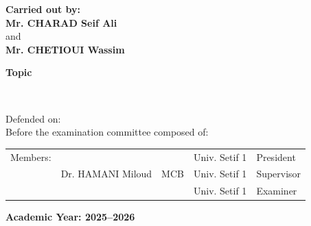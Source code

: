 \documentclass[11pt,a4paper]{report}
\newcommand{\dotline}[1]{\makebox[#1]{\dotfill}}
\newcommand{\blank}{\dotline{4.5cm}}
\newcommand{\defencedate}{\dotline{3cm}}
\newcommand{\juryA}{\blank           &       & Univ. Setif 1 & President}
\newcommand{\juryB}{Dr. HAMANI Miloud & MCB   & Univ. Setif 1 & Supervisor}
\newcommand{\juryC}{\blank           &       & Univ. Setif 1 & Examiner}
\newcommand{\academicyear}{2025--2026}
\begin{document}
\vfill
{\Large\bfseries Carried out by:}\\[0.3cm]
{\large\bfseries Mr. CHARAD Seif Ali}\\[3pt]
and\\[3pt]
{\large\bfseries Mr. CHETIOUI Wassim}

\vfill
{\fontsize{24}{28}\selectfont\bfseries Topic}\\[0.5cm]
\parbox{12.5cm}{\centering\LARGE\bfseries \thesistitle}\\[0.3cm]
{\Large \thesissubtitle}

\vfill
Defended on: \textbf{\defencedate}\\[0.5cm]
Before the examination committee composed of:\\[0.4cm]

\begin{tabular}{l l l l l}
Members: & \juryA\\[8pt]
         & \juryB\\[8pt]
         & \juryC
\end{tabular}

\vfill
{\bfseries Academic Year: \academicyear}
\end{document}
